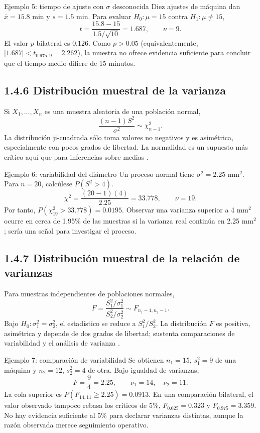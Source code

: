 \begin{examplebox}{Ejemplo 5: tiempo de ajuste con $\sigma$ desconocida}
Diez ajustes de máquina dan $\bar x=15.8$ min y $s=1.5$ min. Para evaluar $H_0:\mu=15$ contra $H_1:\mu\ne15$,
\[
 t=\frac{15.8-15}{1.5/\sqrt{10}}=1.687,\qquad \nu=9.
\]
El valor $p$ bilateral es $0.126$. Como $p>0.05$ (equivalentemente, $|1.687|<t_{0.975,9}=2.262$), la muestra no ofrece evidencia suficiente para concluir que el tiempo medio difiere de 15 minutos.
\end{examplebox}

\subsection{1.4.6 Distribución muestral de la varianza}
Si $X_1,\ldots,X_n$ es una muestra aleatoria de una población normal,
\[
 \frac{(n-1)S^2}{\sigma^2}\sim\chi^2_{n-1}.
\]
La distribución ji-cuadrada sólo toma valores no negativos y es asimétrica, especialmente con pocos grados de libertad. La normalidad es un supuesto más crítico aquí que para inferencias sobre medias \citep{nistChi}.

\begin{examplebox}{Ejemplo 6: variabilidad del diámetro}
Un proceso normal tiene $\sigma^2=2.25$ mm$^2$. Para $n=20$, calcúlese $P(S^2>4)$.
\[
 \chi^2=\frac{(20-1)(4)}{2.25}=33.778,\qquad \nu=19.
\]
Por tanto, $P(\chi^2_{19}>33.778)=0.0195$. Observar una varianza superior a 4 mm$^2$ ocurre en cerca de 1.95\% de las muestras si la varianza real continúa en 2.25 mm$^2$; sería una señal para investigar el proceso.
\end{examplebox}

\subsection{1.4.7 Distribución muestral de la relación de varianzas}
Para muestras independientes de poblaciones normales,
\[
 F=\frac{S_1^2/\sigma_1^2}{S_2^2/\sigma_2^2}\sim F_{n_1-1,n_2-1}.
\]
Bajo $H_0:\sigma_1^2=\sigma_2^2$, el estadístico se reduce a $S_1^2/S_2^2$. La distribución $F$ es positiva, asimétrica y depende de dos grados de libertad; sustenta comparaciones de variabilidad y el análisis de varianza \citep{nistF}.

\begin{examplebox}{Ejemplo 7: comparación de variabilidad}
Se obtienen $n_1=15$, $s_1^2=9$ de una máquina y $n_2=12$, $s_2^2=4$ de otra. Bajo igualdad de varianzas,
\[
 F=\frac{9}{4}=2.25,\qquad \nu_1=14,\quad\nu_2=11.
\]
La cola superior es $P(F_{14,11}\ge2.25)=0.0913$. En una comparación bilateral, el valor observado tampoco rebasa los críticos de 5\%, $F_{0.025}=0.323$ y $F_{0.975}=3.359$. No hay evidencia suficiente al 5\% para declarar varianzas distintas, aunque la razón observada merece seguimiento operativo.
\end{examplebox}

